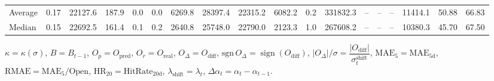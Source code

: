\begin{threeparttable}
{\begin{tabular}{lrrrrrrrrrrrrrrrrr}
Average &     0.17 & 22127.6 &             187.9 &               0.0 &                0.0 &             6269.8 & 28397.4 & 22315.2 &     6082.2 &                      0.2 &            331832.3 &         -- &        -- &             -- &          11414.1 &           50.88 &                  66.83 \\
 Median &     0.15 & 22692.5 &             161.4 &               0.1 &                0.2 &             2640.8 & 25748.0 & 22790.0 &     2123.3 &                      1.0 &            267608.2 &         -- &        -- &             -- &          10380.3 &           45.70 &                  67.50 \\
\bottomrule
\end{tabular}
}
\begin{tablenotes}\footnotesize
\item $\kappa=\kappa(\sigma)$, $B=B_{t-1}$, $O_p=O_{\text{pred}}$, $O_r=O_{\text{real}}$, $O_\Delta=O_{\text{diff}}$, $\mathrm{sgn}\,O_\Delta=\operatorname{sign}(O_{\text{diff}})$, $|O_\Delta|/\sigma=\dfrac{|O_{\text{diff}}|}{\sigma_t^{\text{shift}}}$, $\mathrm{MAE}_5=\mathrm{MAE}_{5\text{d}}$, $\mathrm{RMAE}= \mathrm{MAE}_5 / \text{Open}$, $\mathrm{HR}_{20}=\mathrm{HitRate}_{20\text{d}}$, 
$\lambda_{\text{shift}}=\lambda_t$, 
$\Delta\alpha_t=\alpha_t-\alpha_{t-1}$.
\end{tablenotes}
\end{threeparttable}
\endgroup

